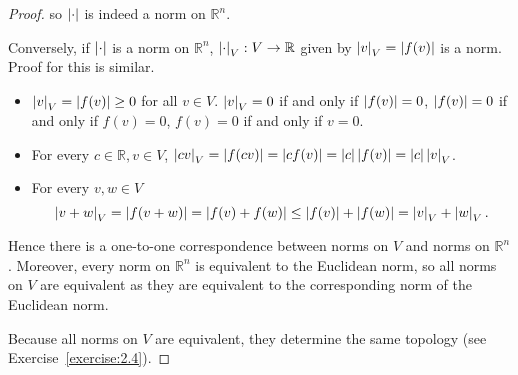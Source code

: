 \begin{proof}
	so $\left\vert{\cdot}\right\vert$ is indeed a norm on $\mathbb{R}^{n}$.

	Conversely, if $\left\vert{\cdot}\right\vert$ is a norm on $\mathbb{R}^{n}$, $\left\vert{\cdot}\right\vert_{V}: V\to \mathbb{R}$ given by $\left\vert{v}\right\vert_{V} = \left\vert{f(v)}\right\vert$ is a norm. Proof for this is similar.
	\begin{itemize}
		\item $\left\vert{v}\right\vert_{V} = \left\vert{f(v)}\right\vert \geq 0$ for all $v\in V$. $\left\vert{v}\right\vert_{V} = 0$ if and only if $\left\vert{f(v)}\right\vert = 0$, $\left\vert{f(v)}\right\vert = 0$ if and only if $f(v) = 0$, $f(v) = 0$ if and only if $v = 0$.
		\item For every $c\in \mathbb{R}, v\in V$, $\left\vert{cv}\right\vert_{V} = \left\vert{f(cv)}\right\vert = \left\vert{cf(v)}\right\vert = \left\vert{c}\right\vert\left\vert{f(v)}\right\vert = \left\vert{c}\right\vert\left\vert{v}\right\vert_{V}$.
		\item For every $v, w\in V$
		      \begin{equation*}
			      \left\vert{v + w}\right\vert_{V} = \left\vert{f(v + w)}\right\vert = \left\vert{f(v) + f(w)}\right\vert \leq \left\vert{f(v)}\right\vert + \left\vert{f(w)}\right\vert = \left\vert{v}\right\vert_{V} + \left\vert{w}\right\vert_{V}.
		      \end{equation*}
	\end{itemize}

	Hence there is a one-to-one correspondence between norms on $V$ and norms on $\mathbb{R}^{n}$. Moreover, every norm on $\mathbb{R}^{n}$ is equivalent to the Euclidean norm, so all norms on $V$ are equivalent as they are equivalent to the corresponding norm of the Euclidean norm.

	Because all norms on $V$ are equivalent, they determine the same topology (see Exercise~\ref{exercise:2.4}).
\end{proof}
